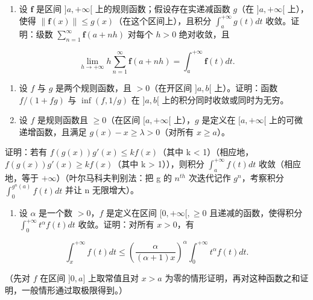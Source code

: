 \begin{enumerate}
\def\labelenumi{\arabic{enumi})}
\setcounter{enumi}{5}
\tightlist
\item
  设 \(\mathbf{f}\) 是区间 \(]a, +\infty[\) 上的规则函数；假设存在实递减函数 \(g\)（在 \(]a, +\infty[\) 上），使得 \(\| \mathbf{f}(x)\| \leqslant g(x)\)（在这个区间上），且积分 \(\int_{a}^{+\infty}g(t)dt\) 收敛。证明：级数 \(\sum_{n=1}^{\infty}\mathbf{f}(a + nh)\) 对每个 \(h > 0\) 绝对收敛，且
\end{enumerate}

\[
\lim _ {h \rightarrow + \infty} h \sum_ {n = 1} ^ {\infty} \mathbf {f} (a + n h) = \int_ {a} ^ {+ \infty} \mathbf {f} (t) d t.
\]

\begin{enumerate}
\def\labelenumi{\arabic{enumi})}
\setcounter{enumi}{6}
\item
  设 \(f\) 与 \(g\) 是两个规则函数，且 \(>0\)（在开区间 \(]a, b[\) 上）。证明：函数 \(f / (1 + fg)\) 与 \(\inf(f, 1/g)\) 在 \(]a, b[\) 上的积分同时收敛或同时为无穷。
\item
  设 \(f\) 是规则函数且 \(\geqslant 0\)（在区间 \([a, +\infty[\) 上），\(g\) 是定义在 \([a, +\infty[\) 上的可微递增函数，且满足 \(g(x) - x \geqslant \lambda > 0\)（对所有 \(x \geqslant a\)）。
\end{enumerate}

证明：若有 \(f(g(x))g'(x) \leqslant kf(x)\)（其中 k \textless{} 1）（相应地，\(f(g(x))g'(x) \geqslant kf(x)\)（其中 k \textgreater{} 1）），则积分 \(\int_{a}^{+\infty} f(t) dt\) 收敛（相应地，等于 \(+\infty\)）（叶尔马科夫判别法：把 g 的 \(n^{th}\) 次迭代记作 \(g^n\)，考察积分 \(\int_{0}^{g^n(a)} f(t) dt\) 并让 n 无限增大）。

\begin{enumerate}
\def\labelenumi{\arabic{enumi})}
\setcounter{enumi}{8}
\tightlist
\item
  设 \(\alpha\) 是一个数 \(>0\)，\(f\) 是定义在区间 \([0, +\infty[, \geqslant 0\) 且递减的函数，使得积分 \(\int_0^{+\infty} t^\alpha f(t) dt\) 收敛。证明：对所有 \(x > 0\)，有
\end{enumerate}

\[
\int_ {x} ^ {+ \infty} f (t) d t \leqslant \left(\frac {\alpha}{(\alpha + 1) x}\right) ^ {\alpha} \int_ {0} ^ {+ \infty} t ^ {\alpha} f (t) d t.
\]

（先对 \(f\) 在区间 \(]0, a]\) 上取常值且对 \(x > a\) 为零的情形证明，再对这种函数之和证明，一般情形通过取极限得到。）
\relax{}
\setcounter{exercisegroup}{2}
